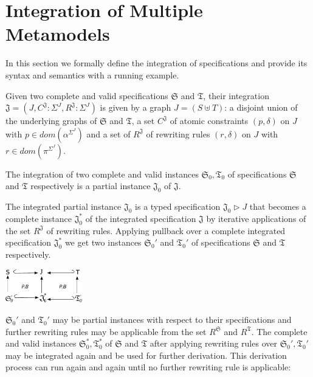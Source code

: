 \documentclass{eceasst}
\begin{document}
\section{Integration of Multiple Metamodels}\label{lbl:integration}
In this section we formally define the integration of specifications and provide its syntax and semantics with a running example. 

\begin{definition}
 Given two complete and valid specifications $\mathfrak{S}$ and $\mathfrak{T}$, their integration $\mathfrak{J} = (J, C^{\mathfrak{J}}: \Sigma^J, R^{\mathfrak{J}}:\Sigma^J)$ is given 
 by a graph $J = (S \uplus T)$: a disjoint union of the underlying graphs of $\mathfrak{S}$ and $\mathfrak{T}$, 
 a set $C^{\mathfrak{J}}$ of atomic constraints $(p, \delta)$ on $J$ with $p \in dom(\alpha^{\Sigma^J})$ and 
 a set of $R^{\mathfrak{J}}$ of rewriting rules $(r,\delta)$ on $J$ with $r \in dom(\pi^{\Sigma^J})$.
\end{definition}

\begin{proposition}
 The integration of two complete and valid instances $\mathfrak{S}_0, \mathfrak{T}_0$ of specifications $\mathfrak{S}$ and $\mathfrak{T}$ respectively is a partial instance 
 $\mathfrak{J}_0$ of $\mathfrak{J}$.  
\end{proposition}

The integrated partial instance $\mathfrak{J}_0$ is a typed specification $\mathfrak{J}_0 \rhd J$ that becomes a complete instance $\mathfrak{J}_0^*$ of the integrated specification 
$\mathfrak{J}$ by iterative applications of the set $R^{\mathfrak{J}}$ of rewriting rules. 
Applying pullback over a complete integrated specification $\mathfrak{J}_0^*$ we get two instances $\mathfrak{S}_0'$ and $\mathfrak{T}_0'$ of 
specifications $\mathfrak{S}$ and $\mathfrak{T}$ respectively.

\begin{center}
\includegraphics[width=0.25\textwidth]{intr-pb.pdf}
\end{center}

\noindent
$\mathfrak{S}_0'$ and $\mathfrak{T}_0'$ may be partial instances with respect to their specifications and further rewriting rules may be applicable 
from the set $R^{\mathfrak{S}}$ and $R^{\mathfrak{T}}$. The complete and valid instances $\mathfrak{S}_0^*, \mathfrak{T}_0^*$ of $\mathfrak{S}$ and $\mathfrak{T}$ after applying rewriting rules over 
$\mathfrak{S}_0', \mathfrak{T}_0'$ may be integrated again and be used for further derivation. This derivation process can run again and again until no further rewriting rule is applicable: 
\end{document}
